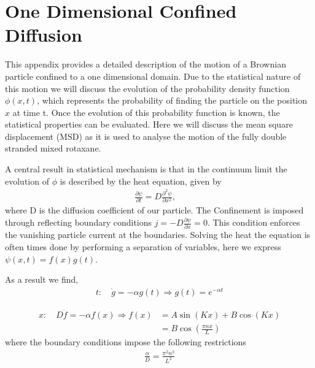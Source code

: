 \chapter{One Dimensional Confined Diffusion}

This appendix provides a detailed description of the motion of a Brownian particle
confined to a one dimensional domain. Due to the statistical nature of this motion we
will discuss the evolution of the probability density function $\phi(x,t)$, which
represents the probability of finding the particle on the position $x$ at time t.
Once the evolution of this probability function is known, the statistical properties can
be evaluated. Here we will discuss the mean square displacement (MSD) as it is used to
analyse the motion of the fully double stranded mixed rotaxane.

A central result in statistical mechanism is that in the continuum limit the evolution of
$\phi$ is  described by the heat equation, given by
\begin{align*}
  \frac{\partial \psi}{\partial t} =  D \frac{\partial^2 \psi}{\partial x^2}, \quad
\end{align*}
where D is the diffusion coefficient of our particle.
The Confinement is imposed through reflecting boundary conditions $j = - D \frac{\partial
\psi}{\partial x} = 0$. This condition enforces the vanishing particle current at the
boundaries. Solving the heat the equation is often times done by performing a separation
of variables, here we express $ \psi(x,t) = f(x)g(t)$.

As a result we find,
\begin{align*}
t:\quad \dot{g} = - \alpha g(t) \Rightarrow g(t) = e^{-\alpha t}
\end{align*}

\begin{align*}
  x:\quad D \ddot{f} = - \alpha f(x) \Rightarrow f(x) &= A \sin(K x) + B \cos(Kx)\\
  &= B \cos(\frac{\pi n x}{L})
\end{align*}
where the boundary conditions impose the following restrictions
\begin{align*}
  \frac{\alpha}{D} = \frac{\pi^2 n^2}{L^2}
\end{align*}

